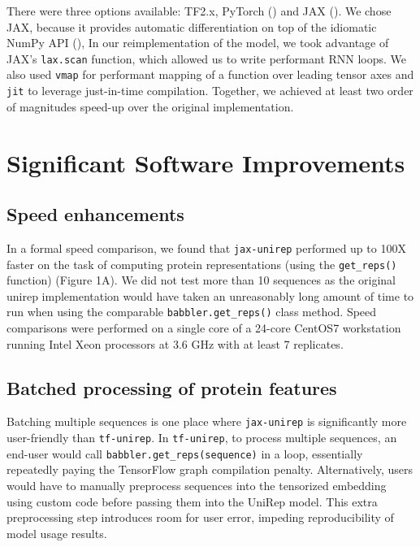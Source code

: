 \documentclass[twoside,11pt]{article}
\begin{document}
There were three options available: TF2.x, PyTorch (\cite{pytorch})
and JAX (\cite{jax2018github}).
We chose JAX, because it provides automatic differentiation
on top of the idiomatic NumPy API (\cite{oliphant2006guide}),
In our reimplementation of the model,
we took advantage of JAX's \verb|lax.scan| function,
which allowed us to write performant RNN loops.
We also used \verb|vmap| for performant mapping of a function
over leading tensor axes
and \verb|jit| to leverage just-in-time compilation.
Together, we achieved at least two order of magnitudes speed-up
over the original implementation.

\section{Significant Software Improvements}

\subsection{Speed enhancements}

In a formal speed comparison, we found that \verb|jax-unirep|
performed up to 100X faster on the task of computing protein representations
(using the \verb|get_reps()| function) (Figure 1A\vphantom{\ref{fig:01}}).
We did not test more than 10 sequences
as the original unirep implementation would have taken
an unreasonably long amount of time to run
when using the comparable \verb|babbler.get_reps()| class method.
Speed comparisons were performed on a single core of a 24-core
CentOS7 workstation running Intel Xeon processors at 3.6 GHz
with at least 7 replicates.

\subsection{Batched processing of protein features}

Batching multiple sequences is one place where \verb|jax-unirep|
is significantly more user-friendly than \verb|tf-unirep|.
In \verb|tf-unirep|, to process multiple sequences,
an end-user would call \verb|babbler.get_reps(sequence)| in a loop,
essentially repeatedly paying the TensorFlow graph compilation penalty.
Alternatively, users would have to manually preprocess sequences
into the tensorized embedding using custom code
before passing them into the UniRep model.
This extra preprocessing step introduces room for user error,
impeding reproducibility of model usage results.
\end{document}
